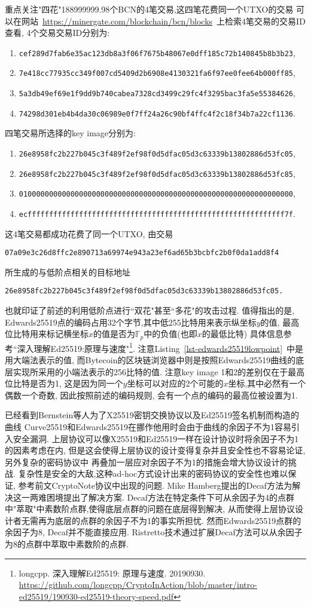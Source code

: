 \documentclass{article}
\newcommand{\F}{\mathbb{F}}
\begin{document}
重点关注"四花"188999999.98个BCN的4笔交易,这四笔花费同一个UTXO的交易
可以在网站~\url{https://minergate.com/blockchain/bcn/blocks}~上检索4笔交易的交易ID查看,
4个交易交易ID分别为: 
\begin{enumerate}
\item \texttt{cef289d7fab6e35ac123db8a3f06f7675b48067e0dff185c72b140845b8b3b23},
\item \texttt{7e418cc77935cc349f007cd5409d2b6908e4130321fa6f97ee0fee64b000ff85},
\item \texttt{5a3db49ef69e1f9dd9b740cabea7328cd3499c29fc4f3295bac3fa5e55384626},
\item \texttt{74298d301eb4b4da30c06989e0f7ff24a26c90bf4ffc4f2c18f34b7a22cf1136}.
\end{enumerate}
四笔交易所选择的key image分别为:
\begin{enumerate}
\item \texttt{26e8958fc2b227b045c3f489f2ef98f0d5dfac05d3c63339b13802886d53fc05},
\item \texttt{26e8958fc2b227b045c3f489f2ef98f0d5dfac05d3c63339b13802886d53fc85},
\item \texttt{0100000000000000000000000000000000000000000000000000000000000000},
\item \texttt{ecffffffffffffffffffffffffffffffffffffffffffffffffffffffffffff7f}.
\end{enumerate}
这4笔交易都成功花费了同一个UTXO, 由交易\\
\centerline{\texttt{07a09e3c26d8ffc2e890713a69974e943a23ef6ad65b3bcbfc2b0f0da1add8f4}}
所生成的与低阶点相关的目标地址\\
\centerline{\texttt{26e8958fc2b227b045c3f489f2ef98f0d5dfac05d3c63339b13802886d53fc05.}}
也就印证了前述的利用低阶点进行``双花"甚至``多花"的攻击过程.
值得指出的是, Edwards25519点的编码占用32个字节,其中低255比特用来表示纵坐标$y$的值,
最高位比特用来标记横坐标$x$的值是否为$\F_p$中的负值(也即$x$的最低比特)
具体信息参考``深入理解Ed25519:原理与速度"\footnote{
longcpp. 深入理解Ed25519: 原理与速度. 20190930. 
\url{https://github.com/longcpp/CryptoInAction/blob/master/intro-ed25519/190930-ed25519-theory-speed.pdf}}.
注意Listing~\ref{lst-edwards25519lowpoint}~中是用大端法表示的值,
而Bytecoin的区块链浏览器中则是按照Edwards25519曲线的底层实现所采用的小端法表示的256比特的值.
注意key image 1和2的差别仅在于最高位比特是否为1,
这是因为同一个$y$坐标可以对应的2个可能的$x$坐标,其中必然有一个偶数一个奇数,
因此按照前述的编码规则, 会有一个点的编码的最高位被设置为1.

已经看到Bernstein等人为了X25519密钥交换协议以及Ed25519签名机制而构造的曲线
Curve25519和Edwards25519在挪作他用时会由于曲线的余因子不为1容易引入安全漏洞.
上层协议可以像X25519和Ed25519一样在设计协议时将余因子不为1的因素考虑在内,
但是这会使得上层协议的设计变得复杂并且安全性也不容易论证,另外复杂的密码协议中
再叠加一层应对余因子不为1的措施会增大协议设计的挑战.
复杂性是安全的大敌,这种ad-hoc方式设计出来的密码协议的安全性也难以保证,
参考前文CryptoNote协议中出现的问题.
Mike Hamberg提出的Decaf方法为解决这一两难困境提出了解决方案.
Decaf方法在特定条件下可从余因子为4的点群中"萃取"中素数阶点群,使得底层点群的问题在底层得到解决,
从而使得上层协议设计者无需再为底层的点群的余因子不为1的事实所担忧.
然而Edwards25519点群的余因子为8, Decaf并不能直接应用.
Ristretto技术通过扩展Decaf方法可以从余因子为8的点群中萃取中素数阶的点群.
\end{document}
